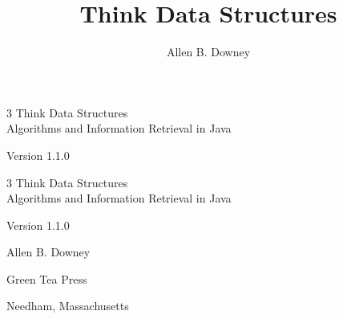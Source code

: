 \documentclass[12pt]{book}
\title{Think Data Structures}
\author{Allen B. Downey}
\newcommand{\thetitle}{Think Data Structures}
\newcommand{\thesubtitle}{Algorithms and Information Retrieval in Java}
\newcommand{\theauthors}{Allen B. Downey}
\newcommand{\theversion}{1.1.0}
\theoremstyle{exercise}
\newif\ifplastex
\begin{document}
\frontmatter

\ifplastex

\maketitle

\else

\begin{latexonly}

\thispagestyle{empty}

\begin{flushright}
\vspace*{2.0in}

\begin{spacing}{3}
{\huge \thetitle} \\
{\Large \thesubtitle}
\end{spacing}

\vspace{0.25in}

Version \theversion

\vfill
\end{flushright}

\newpage
\thispagestyle{empty}

\quad

\newpage
\thispagestyle{empty}

\begin{flushright}
\vspace*{2.0in}

\begin{spacing}{3}
{\huge \thetitle} \\
{\Large \thesubtitle}
\end{spacing}

\vspace{0.25in}

Version \theversion

\vspace{1in}

{\Large \theauthors}

\vspace{0.5in}

{\Large Green Tea Press}

{\small Needham, Massachusetts}

\vfill
\end{flushright}


\end{latexonly}
\end{document}
